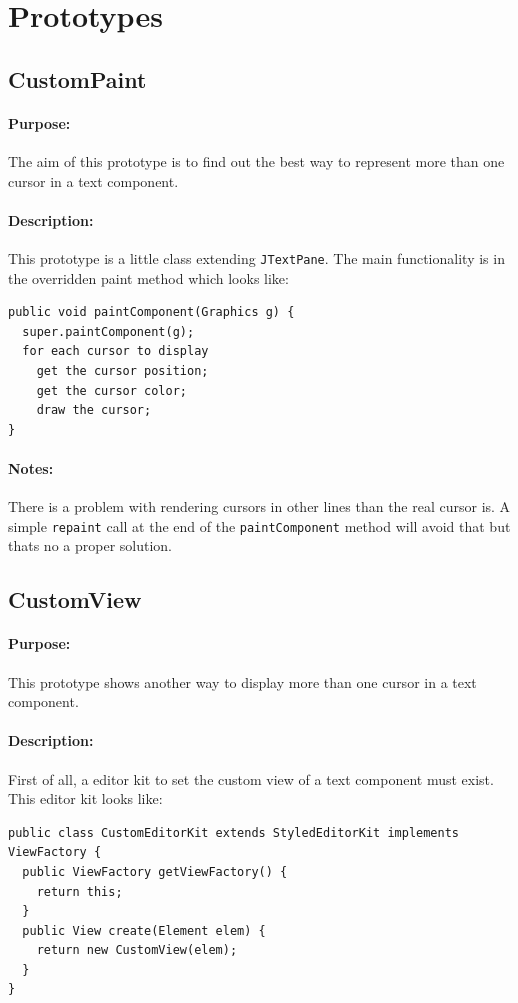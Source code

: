 \documentclass[11pt,a4paper]{article}
\begin{document}
\section{Prototypes}
\subsection{CustomPaint}
\paragraph{Purpose:}
The aim of this prototype is to find out the best way to represent more than one cursor in a text component.
\paragraph{Description:}
This prototype is a little class extending \texttt{JTextPane}. The main functionality is in the overridden paint method which looks like:
\begin{verbatim}
public void paintComponent(Graphics g) {
  super.paintComponent(g);
  for each cursor to display
    get the cursor position;
    get the cursor color;
    draw the cursor;
}
\end{verbatim}
\paragraph{Notes:}
There is a problem with rendering cursors in other lines than the real cursor is. A simple \texttt{repaint} call at the end of the \texttt{paintComponent} method will avoid that but thats no a proper solution.



\subsection{CustomView}
\paragraph{Purpose:}
This prototype shows another way to display more than one cursor in a text component.
\paragraph{Description:}

First of all, a editor kit to set the custom view of a text component must exist. This editor kit looks like:
\begin{verbatim}
public class CustomEditorKit extends StyledEditorKit implements ViewFactory {
  public ViewFactory getViewFactory() {
    return this;
  }
  public View create(Element elem) {
    return new CustomView(elem);
  }
}
\end{verbatim}
\end{document}
